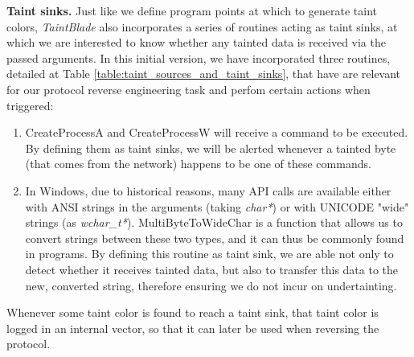 \documentclass[conference]{IEEEtran}
\begin{document}
\textbf{Taint sinks.} Just like we define program points at which to generate taint colors,
\textit{TaintBlade} also incorporates a series of routines acting as taint sinks,
at which we are interested to know whether any tainted data is received via the passed
arguments. In this initial version, we have incorporated three routines, detailed at
Table \ref{table:taint_sources_and_taint_sinks}, that have are relevant for our protocol
reverse engineering task and perfom certain actions when triggered:
\begin{enumerate}
    \item CreateProcessA and CreateProcessW will receive a command to be executed. By
          defining them as taint sinks, we will be alerted whenever a tainted byte (that
          comes from the network) happens to be one of these commands.
    \item In Windows, due to historical reasons, many API calls are available either with
          ANSI strings in the arguments (taking \textit{char*}) or with UNICODE "wide"
          strings (as \textit{wchar\_t*}). MultiByteToWideChar is a function that allows
          us to convert strings between these two types, and it can thus be commonly
          found in programs. By defining this routine as taint sink, we are able not only
          to detect whether it receives tainted data, but also to transfer this data to
          the new, converted string, therefore ensuring we do not incur on undertainting.
\end{enumerate}

Whenever some taint color is found to reach a taint sink, that taint color is
logged in an internal vector, so that it can later be used when reversing the
protocol.
\end{document}
